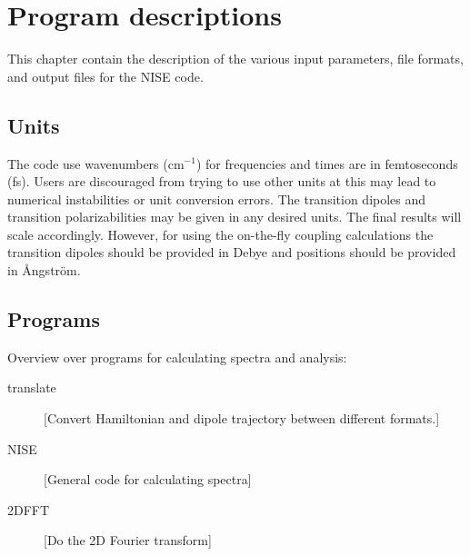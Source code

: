 \chapter{Program descriptions}
This chapter contain the description of the various input parameters, file formats, and output files for the NISE code.
\section{Units}
The code use wavenumbers (cm$^{-1}$) for frequencies and times are in femtoseconds (fs). Users are discouraged from trying to use other units at this may lead to numerical instabilities or unit conversion errors. The transition
dipoles and transition polarizabilities may be given in any desired units. The final results will scale accordingly. However, for using the on-the-fly coupling calculations the transition dipoles should be provided in Debye and positions should be provided in \AA ngstr\"{o}m. 

\section{Programs}
Overview over programs for calculating spectra and analysis:\\
\begin{description}
\item [translate] [Convert Hamiltonian and dipole trajectory between different formats.]
\item [NISE] [General code for calculating spectra]
\item [2DFFT] [Do the 2D Fourier transform]
\end{description}


